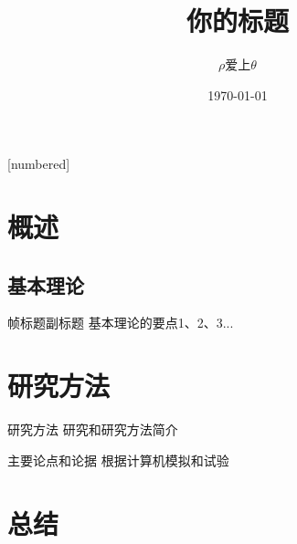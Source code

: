 \documentclass[14pt,hyperref={CJKbookmarks=true}]{beamer} %
\begin{document}
	\newtheorem{THeorem}{定理}  %
	\newtheorem{DEfinition}{定义} %
	\newtheorem{PRoof}{证明}  %
	\theoremstyle{example}
	\newtheorem{EXample}{示例}  %
	[numbered]  %
	\title{你的标题}
	\author{$\rho$爱上$\theta$}
	\date{\today}
	\begin{frame}
		\titlepage
	\end{frame}
	\section{概述}
	\subsection{基本理论}
	\begin{frame}{帧标题}{副标题}
		基本理论的要点1、2、3...
	\end{frame}
	\section{研究方法}
	\begin{frame}{研究方法}
		研究和研究方法简介
	\end{frame}
	\begin{frame}{主要论点和论据}
		根据计算机模拟和试验
	\end{frame}
	\section{总结}
\end{document}
